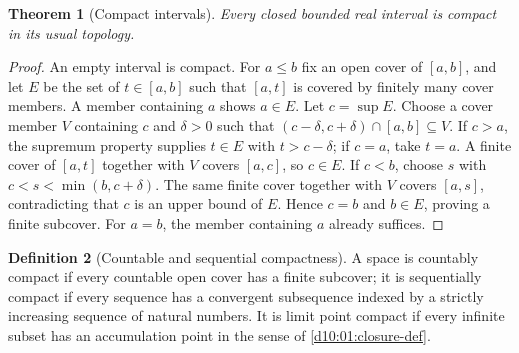 \documentclass[11pt,oneside,openany]{book}
\newtheorem{theorem}{Theorem}[chapter]
\theoremstyle{definition}
\newtheorem{definition}[theorem]{Definition}
\theoremstyle{remark}
\begin{document}
\begin{theorem}[Compact intervals]\label{d10:05:interval}
Every closed bounded real interval is compact in its usual topology.
\end{theorem}
\begin{proof}
An empty interval is compact. For $a\le b$ fix an open cover of $[a,b]$, and let $E$ be the set of $t\in[a,b]$ such that $[a,t]$ is covered by finitely many cover members. A member containing $a$ shows $a\in E$. Let $c=\sup E$. Choose a cover member $V$ containing $c$ and $\delta>0$ such that $(c-\delta,c+\delta)\cap[a,b]\subseteq V$. If $c>a$, the supremum property supplies $t\in E$ with $t>c-\delta$; if $c=a$, take $t=a$. A finite cover of $[a,t]$ together with $V$ covers $[a,c]$, so $c\in E$. If $c<b$, choose $s$ with $c<s<\min(b,c+\delta)$. The same finite cover together with $V$ covers $[a,s]$, contradicting that $c$ is an upper bound of $E$. Hence $c=b$ and $b\in E$, proving a finite subcover. For $a=b$, the member containing $a$ already suffices.
\end{proof}

\begin{definition}[Countable and sequential compactness]\label{d10:05:compact-variants}
A space is countably compact if every countable open cover has a finite subcover; it is sequentially compact if every sequence has a convergent subsequence indexed by a strictly increasing sequence of natural numbers. It is limit point compact if every infinite subset has an accumulation point in the sense of \cref{d10:01:closure-def}.
\end{definition}
\end{document}
